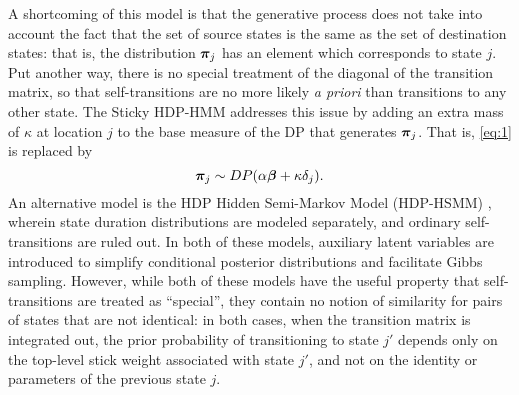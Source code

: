 A shortcoming of this model is that the generative process does not
take into account the fact that the set of source states is the same
as the set of destination states: that is, the distribution $\boldsymbol{\pi}_j$
has an element which corresponds to state $j$.  Put another way, there
is no special treatment of the diagonal of the transition matrix, so
that self-transitions are no more likely {\it a priori} than
transitions to any other state.  The Sticky HDP-HMM \cite{fox2008hdp}
addresses this issue by adding an extra mass of $\kappa$ at location $j$ to the base
measure of the DP that generates $\boldsymbol{\pi}_j$.  That is, \eqref{eq:1} is replaced by
\begin{equation}
  \label{eq:6}
  \boldsymbol{\pi}_j \sim DP(\alpha\boldsymbol{\beta} + \kappa \delta_j).
\end{equation}
An alternative model is the HDP Hidden Semi-Markov Model (HDP-HSMM)
\cite{johnson2013bayesian}, wherein state duration distributions are modeled
separately, and ordinary self-transitions are ruled out.  In both of
these models, auxiliary latent variables are introduced to simplify
conditional posterior distributions and facilitate Gibbs sampling.
However, while both of these models have the useful property that
self-transitions are treated as ``special'', they contain no notion of
similarity for pairs of states that are not identical: 
in both cases, when the transition matrix
is integrated out, the prior probability of
transitioning to state $j'$ depends only on the top-level stick
weight associated with state $j'$, and not on the identity or
parameters of the previous state $j$.
